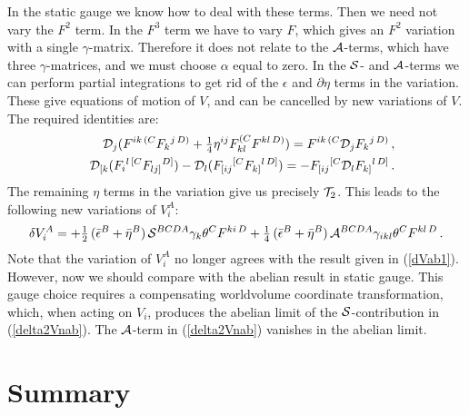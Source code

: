 \documentclass[12pt,a4paper]{article}
\def\half{{\textstyle {1 \over 2}}}
\def\quart{{\textstyle {1 \over 4}}}
\def\Dpartial{{\cal D}}
\begin{document}
In the static gauge we know how to deal with these terms. Then
we need not vary the $F^2$ term. In the $F^3$ term we have to vary $F$, which
gives an $F^2$ variation with a single $\gamma$-matrix. Therefore it does not
relate to the ${\cal A}$-terms, which have three
$\gamma$-matrices, and we must choose $\alpha$ equal
to zero. In the ${\cal S}$- and ${\cal A}$-terms we can perform partial
integrations to get rid of the $\epsilon$ and $\partial\eta$ terms in
the variation. These give equations of motion of $V$, and can be cancelled
by new variations of $V$. The required identities are:
\begin{eqnarray}
     && \Dpartial_j  (F^{ik\,(C}F_{k}{}^{j\,D)} +
       \quart \eta^{ij} F_{kl}^{(C} F^{kl\,D)})
      = F^{ik\,(C} \Dpartial_j F_k{}^{j\,D)}           \,,
      \\
     &&    \Dpartial_{[k}( F_{i}{}^{l\,[C} F_{lj]}{}^{D]}) -
     \Dpartial_l (F_{[ij}{}^{[C} F_{k]}{}^{l\,D]})
        = - F_{[ij}{}^{[C} \Dpartial_l F_{k]}{}^{l\,D]}    \,.
\end{eqnarray}
The remaining $\eta$ terms in the variation give us precisely ${\cal T}_2$.
This leads to the following new variations of $V_i^A$:
\begin{equation}
\label{delta2Vnab}
  \delta V_i^A =
      +\half\,(\bar\epsilon^B + \bar\eta^B)\,
              {\cal S}^{BCDA} \gamma_k\theta^C F^{ki\,D}
        + \quart\,(\bar\epsilon^B+\bar\eta^B)\,{\cal A}^{BCDA}\gamma_{ikl}\theta^C
                F^{kl\,D}\,.
\end{equation}
Note that the variation of $V_i^A$ no longer agrees with the
result given in (\ref{dVab1}).
However, now we should
compare with the abelian result in static gauge. This gauge choice
requires a compensating worldvolume coordinate transformation, which, when
acting on $V_i$, produces the abelian limit of the ${\cal S}$-contribution
in (\ref{delta2Vnab}). The ${\cal A}$-term in (\ref{delta2Vnab}) vanishes
in the abelian limit.

\section{Summary\label{Summ}}
\end{document}
